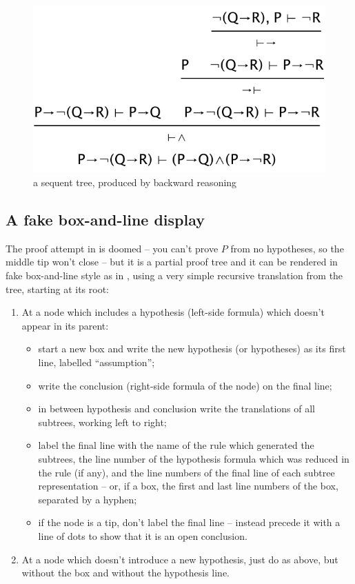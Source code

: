 \documentclass[11pt]{article}
\newcommand{\picscale}{0.6}
\begin{document}
\begin{figure}
\centering
\includegraphics[scale=\picscale]{pics/firsttree}
\caption{a sequent tree, produced by backward reasoning}
\label{fig:firsttree}
\end{figure}

\subsection{A fake box-and-line display}

The proof attempt in  is doomed -- you can't prove $P$ from no hypotheses, so the middle tip won't close -- but it is a partial proof tree and it can be rendered in fake box-and-line style as in , using a very simple recursive translation from the tree, starting at its root: 
\begin{enumerate}
\item At a node which includes a hypothesis (left-side formula) which doesn't appear in its parent:
\begin{itemize}
\item  start a new box and write the new hypothesis (or hypotheses) as its first line, labelled ``assumption'';
\item write the conclusion (right-side formula of the node) on the final line; 
\item in between hypothesis and conclusion write the translations of all subtrees, working left to right;
\item label the final line with the name of the rule which generated the subtrees, the line number of the hypothesis formula which was reduced in the rule (if any), and the line numbers of the final line of each subtree representation -- or, if a box, the first and last line numbers of the box, separated by a hyphen;
\item if the node is a tip, don't label the final line -- instead precede it with a line of dots to show that it is an open conclusion.
\end{itemize}
\item At a node which doesn't introduce a new hypothesis, just do as above, but without the box and without the hypothesis line.
\end{enumerate}
 
\end{document}
